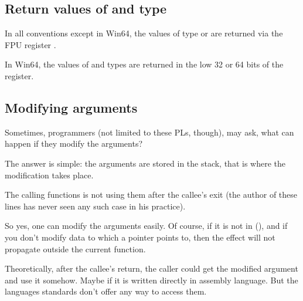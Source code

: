 \subsection{Return values of \Tfloat and \Tdouble type}

In all conventions except in Win64, the values of type \Tfloat or \Tdouble are returned via the FPU register .

In Win64, the values of \Tfloat and \Tdouble types are returned 
in the low 32 or 64 bits of the  register.

\subsection{Modifying arguments}

Sometimes, \CCpp{} programmers (not limited to these \ac{PL}s, though),
may ask, what can happen if they modify the arguments?

The answer is simple: the arguments are stored in the stack, 
that is where the modification takes place.

The calling functions is not using them after the \gls{callee}'s exit (the author of these lines has never seen any such case in his practice).






So yes, one can modify the arguments easily.
Of course, if it is not  in \Cpp{} (),
and if you don't modify data to which a pointer points to, 
then the effect will not propagate outside the current function.

Theoretically, after the \gls{callee}'s return, 
the \gls{caller} could get the modified argument and use it somehow.
Maybe if it is written directly in assembly language.
But the \CCpp languages standards don't offer any way to access them.



